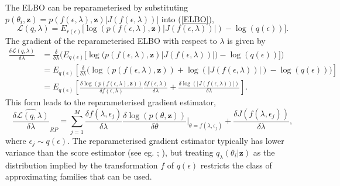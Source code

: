 \documentclass[12pt,a4paper]{article}\usepackage[]{graphicx}\usepackage[]{color}
\begin{document}
The ELBO can be reparameterised by substituting $p(\theta_i, \textbf{z}) = p(f(\epsilon, \lambda), \textbf{z})|J(f(\epsilon, \lambda))|$ into (\ref{ELBO}),
\begin{equation}
\label{rpELBO}
\mathcal{L}(q, \lambda) = E_{r(\epsilon)} \bigg[\log(p(f(\epsilon,\lambda), \textbf{z})|J(f(\epsilon, \lambda))|) - \log(q(\epsilon))\bigg].
\end{equation}
The gradient of the reparameterised ELBO with respect to $\lambda$ is given by 
\begin{align}
\label{rpELBODeriv}
\frac{\delta\mathcal{L}(q, \lambda)}{\delta \lambda} &= \frac{\delta}{\delta \lambda} \bigg( E_{q(\epsilon)} \bigg[\log\big(p(f(\epsilon,\lambda), \textbf{z})|J(f(\epsilon, \lambda))|\big) - \log(q(\epsilon))\bigg] \bigg) \nonumber \\
&= E_{q(\epsilon)} \left[ \frac{\delta}{\delta \lambda} \bigg(\log(p(f(\epsilon,\lambda), \textbf{z})) + \log(|J(f(\epsilon, \lambda))|) - \log(q(\epsilon)) \bigg)\right] \nonumber \\
&= E_{q(\epsilon)} \left[ \frac{\delta \log(p(f(\epsilon,\lambda), \textbf{z}))}{\delta f(\epsilon,\lambda)} \frac{\delta f(\epsilon,\lambda)}{\delta \lambda}  + \frac{\delta \log(|J(f(\epsilon, \lambda))|)}{\delta \lambda} \right].
\end{align}
This form leads to the reparameterised gradient estimator,
\begin{equation}
\label{rpDeriv}
\widehat{\frac{\delta\mathcal{L}(q, \lambda)}{\delta \lambda}}_{RP} = \sum_{j = 1}^M \frac{\delta f(\lambda, \epsilon_j)}{\delta \lambda} \frac{\delta \log(p(\theta, \textbf{z}))}{\delta \theta} \bigg\rvert_{\theta = f(\lambda, \epsilon_j)} + \frac{\delta J(f(\lambda, \epsilon_j))}{\delta \lambda}, 
\end{equation}
where $\epsilon_j \sim q(\epsilon)$. The reparameterised gradient estimator typically has lower variance than the score estimator (see eg. \cite{Rezende2014}; \cite{Ruiz2016}), but treating $q_{\lambda}(\theta_i | \textbf{z})$ as the distribution implied by the transformation $f$ of $q(\epsilon)$ restricts the class of approximating families that can be used.
\\
\end{document}
